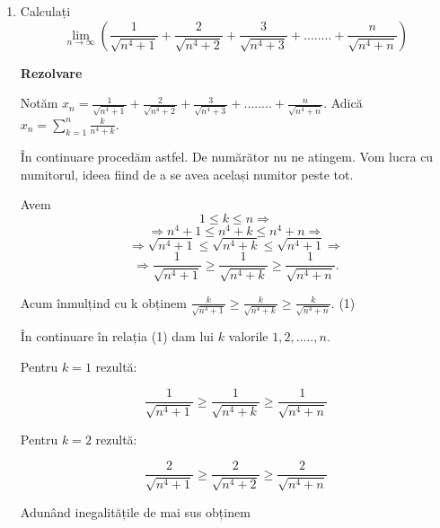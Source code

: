 \documentclass[a4paper,12pt,oneside]{report}
\begin{document}
\begin{enumerate}
 \item Calculați
\begin{displaymath}
   \lim_{n\to\infty }\left ( \frac{1}{\sqrt{n^{4}+1}}+ \frac{2}{\sqrt{n^{4}+2} } +\frac{3}{\sqrt{n^{4}+3}}+........+\frac{n}{\sqrt{n^{4}+n}}  \right )
\end{displaymath}


\textbf{Rezolvare}

Notăm \( x_{n}= \frac{1}{\sqrt{n^{4}+1}} + \frac{2}{\sqrt{n^{4}+2}}+\frac{3}{\sqrt{n^{4}+3}}+........+\frac{n}{\sqrt{n^{4}+n}} \).
Adică \( x_{n}= \sum_{k=1}^{n}\frac{k}{n^{4}+k}\).

În continuare procedăm astfel. De numărător nu ne atingem. Vom lucra cu numitorul, ideea fiind de a se avea același numitor peste tot. 

Avem 
\begin{displaymath}
  1\leq k\leq n \Rightarrow 
\end{displaymath}
\begin{displaymath}
  \Rightarrow  n^{4}+1 \leq n^{4}+k \leq n^{4}+n \Rightarrow 
\end{displaymath}
\begin{displaymath}
  \Rightarrow  \sqrt{n^{4}+1}\leq \sqrt{n^{4}+k}\leq \sqrt{n^{4}+1} \Rightarrow 
\end{displaymath}
\begin{displaymath}
  \Rightarrow  \frac{1}{\sqrt{n^{4}+1}}\geq \frac{1}{\sqrt{n^{4}+k}}\geq \frac{1}{\sqrt{n^{4}+n}}.
\end{displaymath}


Acum înmulțind cu k obținem \(\frac{k}{\sqrt{n^{4}+1}}\geq \frac{k}{\sqrt{n^{4}+k}}\geq \frac{k}{\sqrt{n^{4}+n}}\). (1) 

În continuare în relația (1) dam lui \(k\) valorile \(1,2,.....,n\). 

Pentru \(k = 1\) rezultă:

\begin{displaymath}
  \frac{1}{\sqrt{n^{4}+1}}\geq \frac{1}{\sqrt{n^{4}+k}}\geq \frac{1}{\sqrt{n^{4}+n}} 
\end{displaymath}


Pentru \(k = 2\) rezultă:

\begin{displaymath}
  \frac{2}{\sqrt{n^{4}+1}}\geq \frac{2}{\sqrt{n^{4}+2}}\geq \frac{2}{\sqrt{n^{4}+n}}
\end{displaymath}


Adunând inegalitățile de mai sus obținem 


\end{enumerate}
\end{document}
